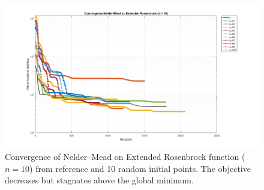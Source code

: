 \documentclass[a4paper,12pt]{article}
\begin{document}
	
	\begin{table}[H]
		\renewcommand{\arraystretch}{1.2}
		\caption{Results of Nelder–Mead on Extended Rosenbrock function.}
		\label{tab:nelder_rosenbrock}
	\end{table}
	
	
		
	\begin{figure}[htbp]
		\centering
		\includegraphics[width=\textwidth]{../immagini/ext_10.png}
		\caption{Convergence of Nelder–Mead on Extended Rosenbrock function ($n=10$) from reference and 10 random initial points. The objective decreases but stagnates above the global minimum.}
		\label{fig:nelder_rosen_10}
	\end{figure}
	
\end{document}

